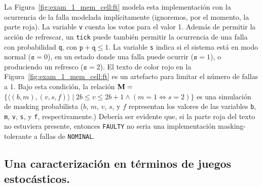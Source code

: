 %

%
La Figura~\ref{fig:exam_1_mem_cell:ft} modela esta implementación con la ocurrencia de la falla modelada implícitamente (ignoremos, por el momento, la parte roja).  La variable \texttt{v} cuenta los votos para el valor 1.
%
Además de permitir la acción de refrescar, un \texttt{tick} puede también permitir la ocurrencia de una falla con probabilidad \texttt{q}, con
$\texttt{p}+\texttt{q}\leq 1$.
%
La variable \texttt{s} indica si el sistema está en modo normal
($\texttt{s}=0$), en un estado donde una falla puede ocurrir ($\texttt{s}=1$),
o produciendo un refresco ($\texttt{s}=2$).
%
El texto de color rojo en la Figura~\ref{fig:exam_1_mem_cell:ft} es un artefacto para limitar el número de fallas a 1.  Bajo esta condición, la relación
%
$\mathbin{\mathbf{M}} = $ $\{{\langle(b,m),(v,s,f)\rangle} \mid {{2b\leq v\leq 2b{+}1} \wedge (m=1 \Leftrightarrow s=2)}\}$
%
es una simulación de masking probabilista ($b$, $m$, $v$, $s$, y
$f$ representan los valores de las variables \texttt{b}, \texttt{m},
\texttt{v}, \texttt{s}, y \texttt{f}, respectivamente.)
%
Debería ser evidente que, si la parte roja del texto no estuviera presente, entonces
\texttt{FAULTY} no seria una implementación masking-tolerante a fallas de \texttt{NOMINAL}. 



\subsection{Una caracterización en términos de juegos estocásticos.}

